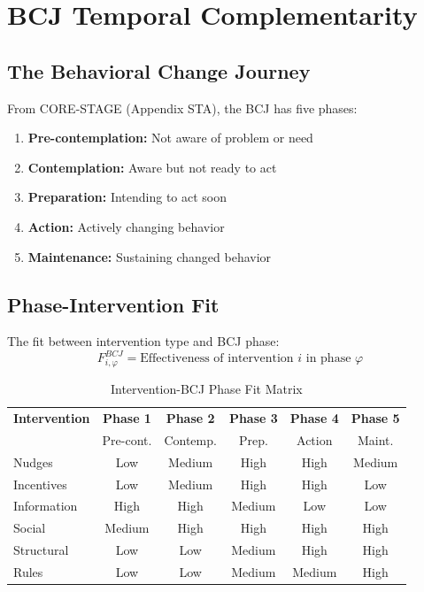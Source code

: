 \section{BCJ Temporal Complementarity}
\label{sec:bcj}

\subsection{The Behavioral Change Journey}

From CORE-STAGE (Appendix STA), the BCJ has five phases:
\begin{enumerate}[noitemsep]
    \item \textbf{Pre-contemplation:} Not aware of problem or need
    \item \textbf{Contemplation:} Aware but not ready to act
    \item \textbf{Preparation:} Intending to act soon
    \item \textbf{Action:} Actively changing behavior
    \item \textbf{Maintenance:} Sustaining changed behavior
\end{enumerate}

\subsection{Phase-Intervention Fit}

\begin{definition}
The fit between intervention type and BCJ phase:
\begin{equation}
F^{BCJ}_{i,\varphi} = \text{Effectiveness of intervention } i \text{ in phase } \varphi
\end{equation}
\end{definition}

\begin{table}[h]
\centering
\caption{Intervention-BCJ Phase Fit Matrix}
\label{tab:bcj-fit}
\renewcommand{\arraystretch}{1.3}
\small
\begin{tabular}{@{}lccccc@{}}
\toprule
\textbf{Intervention} & \textbf{Phase 1} & \textbf{Phase 2} & \textbf{Phase 3} & \textbf{Phase 4} & \textbf{Phase 5} \\
 & Pre-cont. & Contemp. & Prep. & Action & Maint. \\
\midrule
Nudges & Low & Medium & High & High & Medium \\
Incentives & Low & Medium & High & High & Low \\
Information & High & High & Medium & Low & Low \\
Social & Medium & High & High & High & High \\
Structural & Low & Low & Medium & High & High \\
Rules & Low & Low & Medium & Medium & High \\
\bottomrule
\end{tabular}
\end{table}

